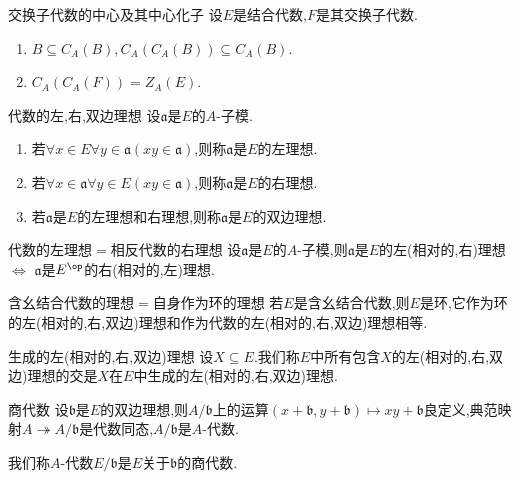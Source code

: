 \begin{proposition}{交换子代数的中心及其中心化子}{}
	设$E$是结合代数,$F$是其交换子代数.
	\begin{enumerate}
		\item $B\subseteq C_{A}\left(B\right),C_{A}\left(C_{A}\left(B\right)\right)\subseteq C_{A}\left(B\right)$.
		\item $C_{A}\left(C_{A}\left(F\right)\right)=Z_{A}\left(E\right)$.
	\end{enumerate}
\end{proposition}

\begin{definition}{代数的左,右,双边理想}{}
	设$\mathfrak{a}$是$E$的$A$-子模.
	\begin{enumerate}
		\item 若$\forall x\in E\forall y\in\mathfrak{a}\left(xy\in\mathfrak{a}\right)$,则称$\mathfrak{a}$是$E$的左理想.
		\item 若$\forall x\in \mathfrak{a}\forall y\in E\left(xy\in\mathfrak{a}\right)$,则称$\mathfrak{a}$是$E$的右理想.
		\item 若$\mathfrak{a}$是$E$的左理想和右理想,则称$\mathfrak{a}$是$E$的双边理想.
	\end{enumerate}
\end{definition}

\begin{proposition}{代数的左理想$=$相反代数的右理想}{}
	设$\mathfrak{a}$是$E$的$A$-子模,则$\mathfrak{a}$是$E$的左(相对的,右)理想$\iff$ $\mathfrak{a}$是$E^{\op}$的右(相对的,左)理想.
\end{proposition}

\begin{proposition}{含幺结合代数的理想$=$自身作为环的理想}{}
	若$E$是含幺结合代数,则$E$是环,它作为环的左(相对的,右,双边)理想和作为代数的左(相对的,右,双边)理想相等.
\end{proposition}

\begin{definition}{生成的左(相对的,右,双边)理想}{}
	设$X\subseteq E$.我们称$E$中所有包含$X$的左(相对的,右,双边)理想的交是$X$在$E$中生成的左(相对的,右,双边)理想.
\end{definition}

\begin{definition}{商代数}{}
	设$\mathfrak{b}$是$E$的双边理想,则$A/\mathfrak{b}$上的运算$\left(x+\mathfrak{b},y+\mathfrak{b}\right)\mapsto xy+\mathfrak{b}$良定义,典范映射$A\twoheadrightarrow A/\mathfrak{b}$是代数同态,$A/\mathfrak{b}$是$A$-代数.
	
	我们称$A$-代数$E/\mathfrak{b}$是$E$关于$\mathfrak{b}$的商代数.
\end{definition}

